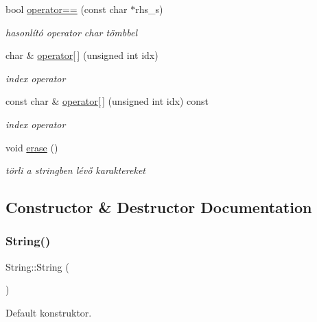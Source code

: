 \begin{DoxyCompactItemize}
bool \mbox{\hyperlink{class_string_ade9af860a809548214837e33367e8835}{operator==}} (const char $\ast$rhs\+\_\+s)
\begin{DoxyCompactList}\small\item\em hasonlító operator char tömbbel \end{DoxyCompactList}\item 
char \& \mbox{\hyperlink{class_string_a1a7c5c39d4dafbbf8516f5058a253f1a}{operator\mbox{[}$\,$\mbox{]}}} (unsigned int idx)
\begin{DoxyCompactList}\small\item\em index operator \end{DoxyCompactList}\item 
const char \& \mbox{\hyperlink{class_string_aaa249e62641872197679cfc7c66118c0}{operator\mbox{[}$\,$\mbox{]}}} (unsigned int idx) const
\begin{DoxyCompactList}\small\item\em index operator \end{DoxyCompactList}\item 
void \mbox{\hyperlink{class_string_a3ce2ea55be9ec912bb2dbc88d461b479}{erase}} ()
\begin{DoxyCompactList}\small\item\em törli a stringben lévő karaktereket \end{DoxyCompactList}\end{DoxyCompactItemize}


\subsection{Constructor \& Destructor Documentation}
\mbox{\label{class_string_a8a7ef356e05eb9b1ea1ab518baee3095}} 
\subsubsection{\texorpdfstring{String()}{String()}\hspace{0.1cm}{\footnotesize\ttfamily [1/4]}}
{\footnotesize\ttfamily String\+::\+String (\begin{DoxyParamCaption}{ }\end{DoxyParamCaption})\hspace{0.3cm}{\ttfamily [inline]}}



Default konstruktor. 

